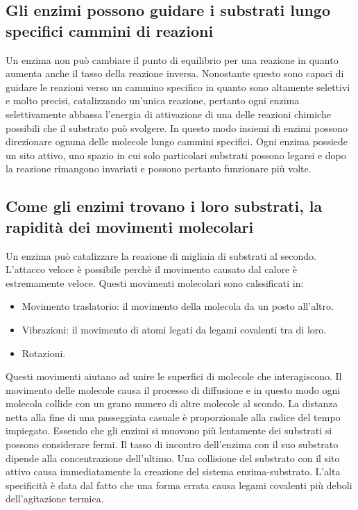 \subsection{Gli enzimi possono guidare i substrati lungo specifici cammini di reazioni}
Un enzima non pu\`o cambiare il punto di equilibrio per una reazione in quanto aumenta anche il tasso della reazione inversa. Nonostante questo sono capaci di guidare le reazioni verso
un cammino specifico in quanto sono altamente selettivi e molto precisi, catalizzando un'unica reazione, pertanto ogni enzima selettivamente abbassa l'energia di attivazione di una delle
reazioni chimiche possibili  che il substrato pu\`o svolgere. In questo modo insiemi di enzimi possono direzionare ognuna delle molecole lungo cammini specifici. Ogni enzima possiede un
sito attivo, uno spazio in cui solo particolari substrati possono legarsi e dopo la reazione rimangono invariati e possono pertanto funzionare pi\`u volte. 
\subsection{Come gli enzimi trovano i loro substrati, la rapidit\`a dei movimenti molecolari}
Un enzima pu\`o catalizzare la reazione di migliaia di substrati al secondo. L'attacco veloce \`e possibile perch\`e il movimento causato dal calore \`e estremamente veloce. Questi 
movimenti molecolari sono calssificati in:
\begin{itemize}
	\item Movimento traslatorio: il movimento della molecola da un posto all'altro.
	\item Vibrazioni: il movimento di atomi legati da legami covalenti tra di loro.
	\item Rotazioni.
\end{itemize}
Questi movimenti aiutano ad unire le superfici di molecole che interagiscono. Il movimento delle molecole causa il processo di diffusione e in questo modo ogni molecola collide con un
grano numero di altre molecole al scondo. La distanza netta alla fine di una passeggiata casuale \`e proporzionale alla radice del tempo impiegato. Essendo che gli enzimi si muovono 
pi\`u lentamente dei substrati si possono considerare fermi. Il tasso di incontro dell'enzima con il suo substrato dipende alla concentrazione dell'ultimo. Una collisione del substrato 
con il sito attivo causa immediatamente la creazione del sistema enzima-substrato. L'alta specificit\`a \`e data dal fatto che una forma errata causa legami covalenti pi\`u deboli 
dell'agitazione termica. 
